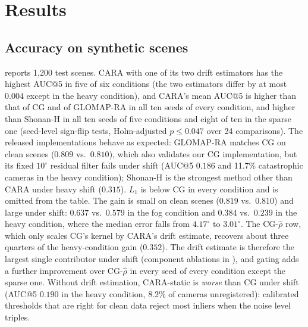 \section{Results}\label{sec:results}



\subsection{Accuracy on synthetic scenes}\label{sec:synth}
 reports 1,200 test scenes. CARA with one of its two drift estimators has the highest AUC@5 in five of six conditions (the two estimators differ by at most $0.004$ except in the heavy condition), and CARA's mean AUC@5 is higher than that of CG and of GLOMAP-RA in all ten seeds of every condition, and higher than Shonan-H in all ten seeds of five conditions and eight of ten in the sparse one (seed-level sign-flip tests, Holm-adjusted $p\le0.047$ over 24 comparisons). The released implementations behave as expected: GLOMAP-RA matches CG on clean scenes ($0.809$ vs.\ $0.810$), which also validates our CG implementation, but its fixed $10^\circ$ residual filter fails under shift (AUC@5 $0.186$ and 11.7\% catastrophic cameras in the heavy condition); Shonan-H is the strongest method other than CARA under heavy shift ($0.315$). $L_1$ is below CG in every condition and is omitted from the table. The gain is small on clean scenes ($0.819$ vs.\ $0.810$) and large under shift: $0.637$ vs.\ $0.579$ in the fog condition and $0.384$ vs.\ $0.239$ in the heavy condition, where the median error falls from $4.17^\circ$ to $3.01^\circ$. The CG-$\hat\rho$ row, which only scales CG's kernel by CARA's drift estimate, recovers about three quarters of the heavy-condition gain ($0.352$). The drift estimate is therefore the largest single contributor under shift (component ablations in ), and gating adds a further improvement over CG-$\hat\rho$ in every seed of every condition except the sparse one. Without drift estimation, CARA-static is \emph{worse} than CG under shift (AUC@5 $0.190$ in the heavy condition, 8.2\% of cameras unregistered): calibrated thresholds that are right for clean data reject most inliers when the noise level triples.

